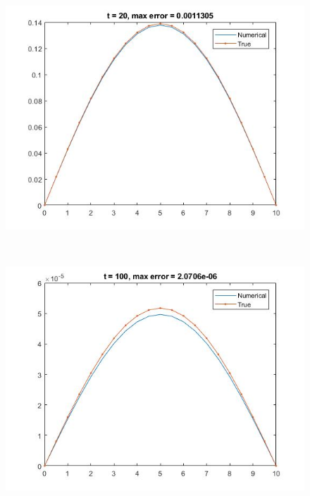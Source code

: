 \begin{figure}
\begin{minipage}{0.5\textwidth}
\end{minipage}
\begin{minipage}{0.5\textwidth}
\includegraphics[width = \textwidth]{9.jpg}
\end{minipage} \\
\begin{minipage}{0.5\textwidth}
\includegraphics[width = \textwidth]{10.jpg}
\end{minipage}
\begin{minipage}{0.5\textwidth}

\end{minipage}
\end{figure}
